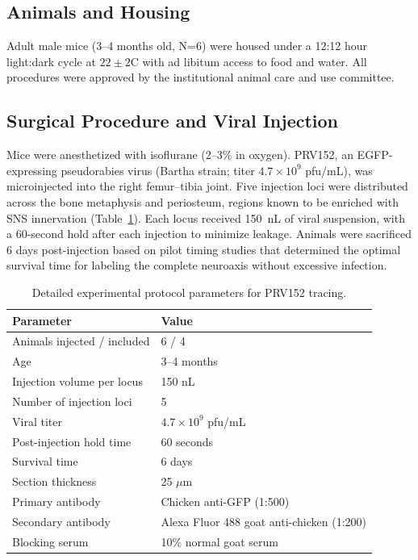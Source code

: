 \documentclass[12pt]{article}
\begin{document}
\subsection{Animals and Housing}

Adult male mice (3--4 months old, N=6) were housed under a 12:12 hour light:dark cycle at $22 \pm 2$\textdegree C with ad libitum access to food and water. All procedures were approved by the institutional animal care and use committee.

\subsection{Surgical Procedure and Viral Injection}

Mice were anesthetized with isoflurane (2--3\% in oxygen). PRV152, an EGFP-expressing pseudorabies virus (Bartha strain; titer $4.7 \times 10^9$ pfu/mL), was microinjected into the right femur--tibia joint. Five injection loci were distributed across the bone metaphysis and periosteum, regions known to be enriched with SNS innervation (Table~\ref{tab:protocol}). Each locus received 150~nL of viral suspension, with a 60-second hold after each injection to minimize leakage. Animals were sacrificed 6 days post-injection based on pilot timing studies that determined the optimal survival time for labeling the complete neuroaxis without excessive infection.

\begin{table}[ht]
\centering
\caption{Detailed experimental protocol parameters for PRV152 tracing.}
\label{tab:protocol}
\begin{tabular}{ll}
\toprule
\textbf{Parameter} & \textbf{Value} \\
\midrule
Animals injected / included & 6 / 4 \\
Age & 3--4 months \\
Injection volume per locus & 150 nL \\
Number of injection loci & 5 \\
Viral titer & $4.7 \times 10^9$ pfu/mL \\
Post-injection hold time & 60 seconds \\
Survival time & 6 days \\
Section thickness & 25 $\mu$m \\
Primary antibody & Chicken anti-GFP (1:500) \\
Secondary antibody & Alexa Fluor 488 goat anti-chicken (1:200) \\
Blocking serum & 10\% normal goat serum \\
\bottomrule
\end{tabular}
\end{table}
\end{document}
